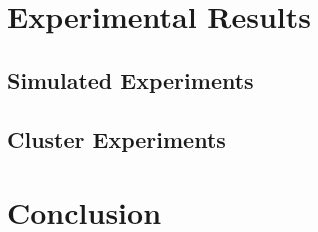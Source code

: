 \documentclass{article}
\begin{document}
\section{Experimental Results}
\subsection{Simulated Experiments}
\subsection{Cluster Experiments}

\section{Conclusion }











\end{document}
